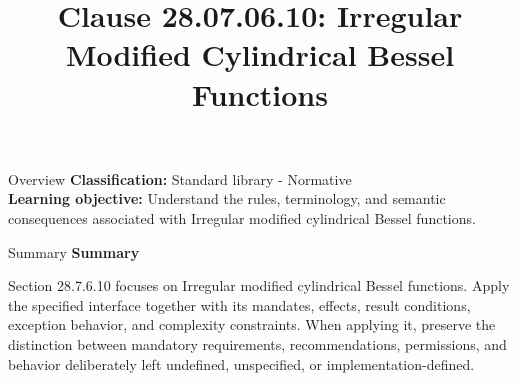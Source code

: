 \documentclass[10pt,letterpaper]{article}
\title{Clause 28.07.06.10: Irregular Modified Cylindrical Bessel Functions}
\author{}
\date{}
\begin{document}
\maketitle
\begin{CornellOverviewBox}{Overview}
\textbf{Classification:} Standard library - Normative\\[2pt]
\textbf{Learning objective:} Understand the rules, terminology, and semantic consequences associated with Irregular modified cylindrical Bessel functions.
\end{CornellOverviewBox}\begin{CornellSummaryBox}{Summary}
{\sffamily\bfseries\color{Accent} Summary}\par\vspace{3pt}Section 28.7.6.10 focuses on Irregular modified cylindrical Bessel functions. Apply the specified interface together with its mandates, effects, result conditions, exception behavior, and complexity constraints. When applying it, preserve the distinction between mandatory requirements, recommendations, permissions, and behavior deliberately left undefined, unspecified, or implementation-defined.
\end{CornellSummaryBox}
\end{document}
